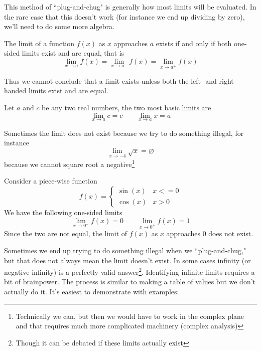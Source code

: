 This method of ``plug-and-chug" is generally how most limits will be evaluated. In the rare case that this doesn't work (for instance we end up dividing by zero), we'll need to do some more algebra.

\begin{theorem}
The limit of a function $f(x)$ as $x$ approaches $a$ exists if and only if both one-sided limits exist and are equal, that is
\[ \lim_{x \to a} f(x) = \lim_{x \to a^-} f(x) = \lim_{x \to a^+} f(x) \]
\end{theorem}

Thus we cannot conclude that a limit exists unless both the left- and right-handed limits exist and are equal. 

\begin{example}
	Let $a$ and $c$ be any two real numbers, the two most basic limits are
	\[ \lim_{x \to a} c = c \qquad \lim_{x \to a} x = a \]
\end{example}


\begin{example}
	Sometimes the limit does not exist because we try to do something illegal, for instance
	\[ \lim_{x \to -4} \sqrt{x} = \varnothing \]
	because we cannot square root a negative\footnote{Technically we can, but then we would have to work in the complex plane and that requires much more complicated machinery (complex analysis)}
\end{example}

\begin{example}
	Consider a piece-wise function
	\[ f(x) = \begin{cases} 
	\sin(x) & x <= 0 \\ 
	\cos(x) & x > 0 
	\end{cases} \]
	We have the following one-sided limits
	\[ \lim_{x \to 0^-} f(x) = 0 \qquad \lim_{x \to 0^+} f(x)= 1 \]
	Since the two are not equal, the limit of $f(x)$ as $x$ approaches $0$ does not exist.
\end{example}

Sometimes we end up trying to do something illegal when we ``plug-and-chug," but that does not always mean the limit doesn't exist. In some cases infinity (or negative infinity) is a perfectly valid answer\footnote{Though it can be debated if these limits actually exist}. Identifying infinite limits requires a bit of brainpower. The process is similar to making a table of values but we don't actually do it. It's easiest to demonstrate with examples:

